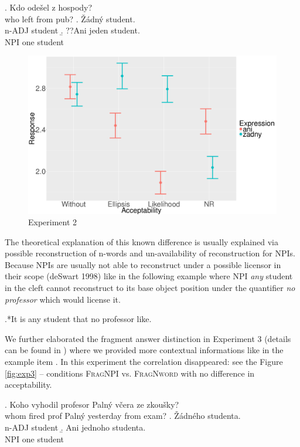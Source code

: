 \documentclass[12pt]{scrartcl}
\begin{document}
\ex. Kdo odešel z hospody?\\
who left from pub? \a. Žádný student.\\
n-ADJ student \b. ??Ani jeden student.\\
NPI one student

\begin{figure}
\centering
\includegraphics{include/mean-sum.png}
\caption{Experiment 2}\label{fig:exp2}
\end{figure}

The theoretical explanation of this known difference is usually explained via possible reconstruction of n-words and un-availability of reconstruction for NPIs. Because NPIs are usually not able to reconstruct under a possible licensor in their scope (deSwart 1998) like in the following example where NPI \textit{any} student in the cleft cannot reconstruct to its base object position under the quantifier \textit{no professor} which would license it. 

\ex.*It is any student that no professor like.

We further elaborated the fragment answer distinction in Experiment 3 (details can be found in \citealt{docekaldotlacilsubber}) where we provided more contextual informations like in the example item \Next. In this experiment the correlation disappeared: see the Figure \ref{fig:exp3} -- conditions \textsc{FragNPI} vs. \textsc{FragNword} with no difference in acceptability.

\ex. Koho vyhodil profesor Palný včera ze zkoušky?\\
whom fired prof Palný yesterday from exam? \a. Žádného studenta.\\
n-ADJ student \b. Ani jednoho studenta.\\
NPI one student
\end{document}
